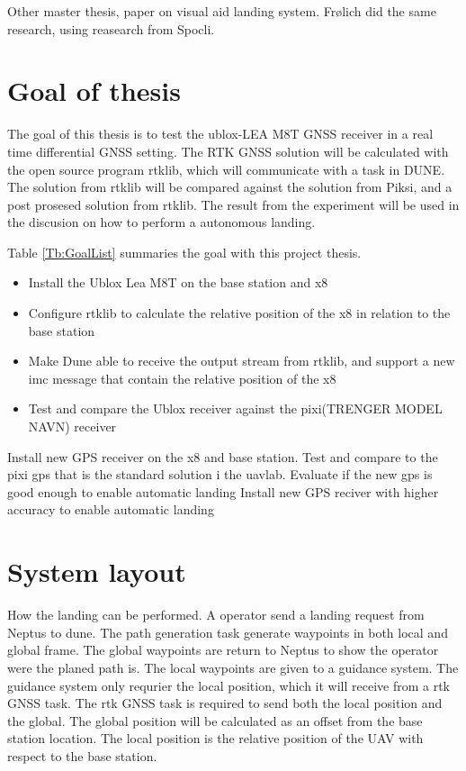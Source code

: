 Other master thesis, paper on visual aid landing system. Frølich did the same research, using reasearch from Spocli.
\section{Goal of thesis}
The goal of this thesis is to test the ublox-LEA M8T GNSS receiver in a real time differential GNSS setting. The RTK GNSS solution will be calculated with the open source program rtklib, which will communicate with a task in DUNE. The solution from rtklib will be compared against the solution from Piksi, and a post prosesed solution from rtklib. The result from the experiment will be used in the discusion on how to perform a autonomous landing.


Table \ref{Tb:GoalList} summaries the goal with this project thesis.
\begin{itemize}\label{Tb:GoalList}
\item Install the Ublox Lea M8T on the base station and x8
\item Configure rtklib to calculate the relative position of the x8 in relation to the base station
\item Make Dune able to receive the output stream from rtklib, and support a new imc message that contain the relative position of the x8
\item Test and compare the Ublox receiver against the pixi(TRENGER MODEL NAVN) receiver
\end{itemize}
Install new GPS receiver on the x8 and base station. Test and compare to the pixi gps that is the standard solution i the uavlab. Evaluate if the new gps is good enough to enable automatic landing
Install new GPS reciver with higher accuracy to enable automatic landing
\section{System layout}
How the landing can be performed. A operator send a landing request from Neptus to dune. The path generation task generate waypoints in both local and global frame. The global waypoints are return to Neptus to show the operator were the planed path is. The local waypoints are given to a guidance system. The guidance system only requrier the local position, which it will receive from a rtk GNSS task. The rtk GNSS task is required to send both the local position and the global. The global position will be calculated as an offset from the base station location. The local position is the relative position of the UAV with respect to the base station.

